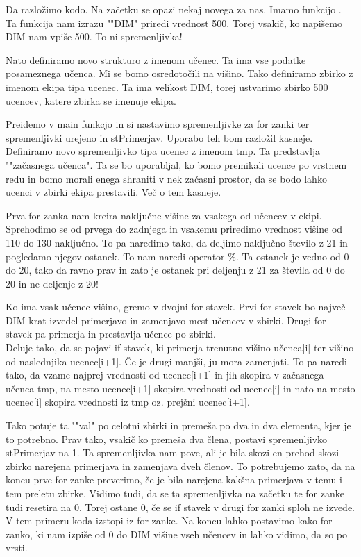 \documentclass[a4paper, 12pt]{article}
\begin{document}
Da razložimo kodo. Na začetku se opazi nekaj novega za nas. Imamo funkcijo . Ta funkcija nam izrazu ""DIM" priredi vrednost 500. Torej vsakič, ko napišemo DIM nam vpiše 500. To ni spremenljivka!\

Nato definiramo novo strukturo z imenom učenec. Ta ima vse podatke posameznega učenca. Mi se bomo osredotočili na višino. Tako definiramo zbirko z imenom ekipa tipa ucenec. Ta ima velikost DIM, torej ustvarimo zbirko 500 ucencev, katere zbirka se imenuje ekipa.\

Preidemo v main funkcjo in si nastavimo spremenljivke za for zanki ter spremenljivki urejeno in stPrimerjav. Uporabo teh bom razložil kasneje. Definiramo novo spremenljivko tipa ucenec z imenom tmp. Ta predstavlja ""začasnega učenca". Ta se bo uporabljal, ko bomo premikali ucence po vrstnem redu in bomo morali enega shraniti v nek začasni prostor, da se bodo lahko ucenci v zbirki ekipa prestavili. Več o tem kasneje.\

Prva for zanka nam kreira naključne višine za vsakega od učencev v ekipi. Sprehodimo se od prvega do zadnjega in vsakemu priredimo vrednost višine od 110 do 130 naključno. To pa naredimo tako, da deljimo naključno število z 21 in pogledamo njegov ostanek. To nam naredi operator \%. Ta ostanek je vedno od 0 do 20, tako da ravno prav in zato je ostanek pri deljenju z 21 za števila od 0 do 20 in ne deljenje z 20!\

Ko ima vsak učenec višino, gremo v dvojni for stavek. Prvi for stavek bo največ DIM-krat izvedel primerjavo in zamenjavo mest učencev v zbirki. Drugi for stavek pa primerja in prestavlja učence po zbirki.\\
Deluje tako, da se pojavi if stavek, ki primerja trenutno višino učenca[i] ter višino od naslednjika ucenec[i+1]. Če je drugi manjši, ju mora zamenjati. To pa naredi tako, da vzame najprej vrednosti od ucenec[i+1] in jih skopira v začasnega učenca tmp, na mesto ucenec[i+1] skopira vrednosti od ucenec[i] in nato na mesto ucenec[i] skopira vrednosti iz tmp oz. prejšni ucenec[i+1].\

Tako potuje ta ""val" po celotni zbirki in premeša po dva in dva elementa, kjer je to potrebno. Prav tako, vsakič ko premeša dva člena, postavi spremenljivko stPrimerjav na 1. Ta spremenljivka nam pove, ali je bila skozi en prehod skozi zbirko narejena primerjava in zamenjava dveh členov. To potrebujemo zato, da na koncu prve for zanke preverimo, če je bila narejena kakšna primerjava v temu i-tem preletu zbirke. Vidimo tudi, da se ta spremenljivka na začetku te for zanke tudi resetira na 0. Torej ostane 0, če se if stavek v drugi for zanki sploh ne izvede. V tem primeru koda izstopi iz for zanke. Na koncu lahko postavimo kako for zanko, ki nam izpiše od 0 do DIM višine vseh učencev in lahko vidimo, da so po vrsti.
\end{document}
